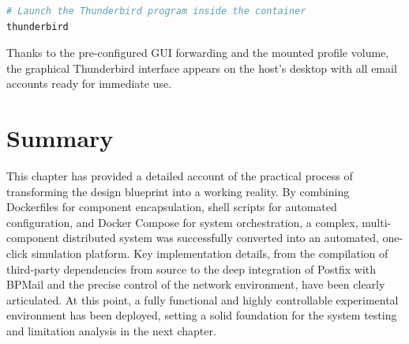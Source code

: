 \begin{lstlisting}[language=bash,caption={Launching Thunderbird inside the container}]
# Launch the Thunderbird program inside the container
thunderbird
\end{lstlisting}


Thanks to the pre-configured GUI forwarding and the mounted profile volume, the graphical Thunderbird interface appears on the host's desktop with all email accounts ready for immediate use.

\section{Summary}
This chapter has provided a detailed account of the practical process of transforming the design blueprint into a working reality. By combining Dockerfiles for component encapsulation, shell scripts for automated configuration, and Docker Compose for system orchestration, a complex, multi-component distributed system was successfully converted into an automated, one-click simulation platform. Key implementation details, from the compilation of third-party dependencies from source to the deep integration of Postfix with BPMail and the precise control of the network environment, have been clearly articulated. At this point, a fully functional and highly controllable experimental environment has been deployed, setting a solid foundation for the system testing and limitation analysis in the next chapter.
